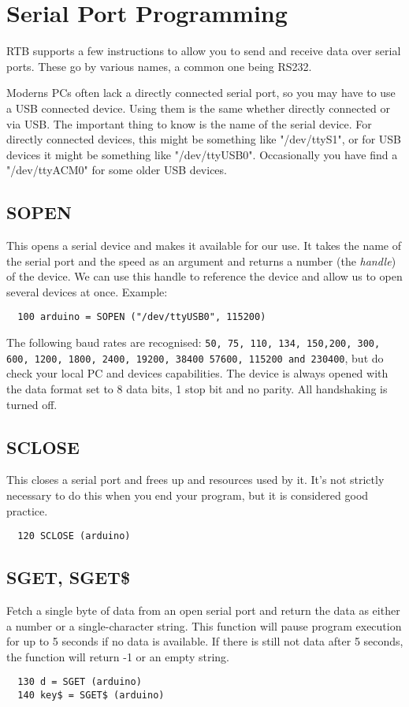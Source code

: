 \chapter{Serial Port Programming}
RTB supports a few instructions to allow you to send and receive data
over serial ports. These go by various names, a common one being RS232.

Moderns PCs often lack a directly connected serial port, so you may have
to use a USB connected device. Using them is the same whether directly
connected or via USB. The important thing to know is the name of the
serial device. For directly connected devices, this might be something
like "/dev/ttyS1", or for USB devices it might be something like
"/dev/ttyUSB0". Occasionally you have find a "/dev/ttyACM0" for some
older USB devices.

\section{SOPEN}
This opens a serial device and makes it available for our use. It
takes the name of the serial port and the speed as an argument and
returns a number (the {\em handle}) of the device. We can use this
handle to reference the device and allow us to open several devices at
once. Example:
\begin{verbatim}
  100 arduino = SOPEN ("/dev/ttyUSB0", 115200)
\end{verbatim}
The following baud rates are recognised: {\tt 50, 75, 110, 134, 150,200,
300, 600, 1200, 1800, 2400, 19200, 38400 57600, 115200 and 230400},
but do check your local PC and devices capabilities. The device is
always opened with the data format set to 8 data bits, 1 stop bit and
no parity. All handshaking is turned off.

\section{SCLOSE}
This closes a serial port and frees up and resources used by it. It's
not strictly necessary to do this when you end your program, but it is
considered good practice.
\begin{verbatim}
  120 SCLOSE (arduino)
\end{verbatim}

\section{SGET, SGET\$}
Fetch a single byte of data from an open serial port and return the
data as either a number or a single-character string. This function will
pause program execution for up to 5 seconds if no data is available. If
there is still not data after 5 seconds, the function will return -1 or
an empty string.
\begin{verbatim}
  130 d = SGET (arduino)
  140 key$ = SGET$ (arduino)
\end{verbatim}

